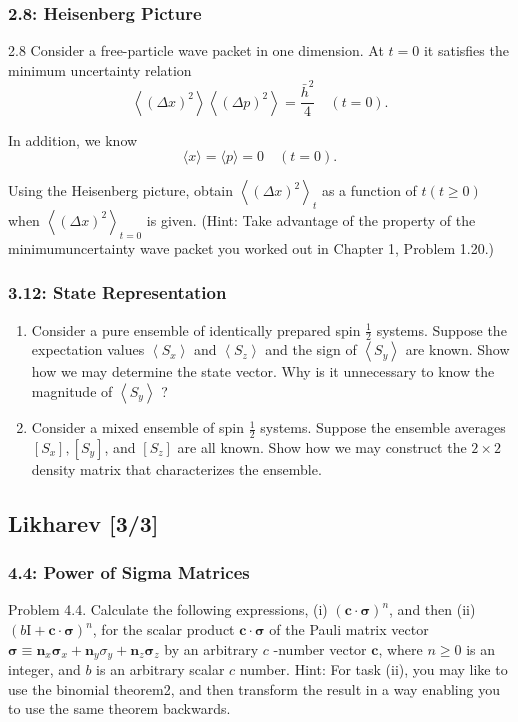 \documentclass[11pt]{article}
\begin{document}
\subsubsection{2.8: Heisenberg Picture}
\label{sec:org493adb9}
2.8 Consider a free-particle wave packet in one dimension. At \(t=0\) it satisfies the minimum uncertainty relation
$$
\left\langle(\Delta x)^2\right\rangle\left\langle(\Delta p)^2\right\rangle=\frac{\bar{h}^2}{4} \quad(t=0) .
$$

In addition, we know
$$
\langle x\rangle=\langle p\rangle=0 \quad(t=0) .
$$

Using the Heisenberg picture, obtain \(\left\langle(\Delta x)^2\right\rangle_t\) as a function of \(t(t \geq 0)\) when \(\left\langle(\Delta x)^2\right\rangle_{t=0}\) is given. (Hint: Take advantage of the property of the minimumuncertainty wave packet you worked out in Chapter 1, Problem 1.20.)
\subsubsection{3.12: State Representation}
\label{sec:org48bc0b4}
\begin{enumerate}
\item Consider a pure ensemble of identically prepared spin \(\frac{1}{2}\) systems.
Suppose the expectation values \(\left\langle S_x\right\rangle\) and
\(\left\langle S_z\right\rangle\) and the sign of \(\left\langle
   S_y\right\rangle\) are known. Show how we may determine the state vector. Why
is it unnecessary to know the magnitude of \(\left\langle S_y\right\rangle\) ?

\item Consider a mixed ensemble of spin \(\frac{1}{2}\) systems. Suppose the ensemble
averages \(\left[S_x\right],\left[S_y\right]\), and \(\left[S_z\right]\) are all
known. Show how we may construct the \(2 \times 2\) density matrix that
characterizes the ensemble.
\end{enumerate}
\subsection{Likharev [3/3]}
\label{sec:org2e076ca}
\subsubsection{4.4: Power of Sigma Matrices}
\label{sec:orgac3360c}
Problem 4.4. Calculate the following expressions, (i) \((\mathbf{c} \cdot
\boldsymbol{\sigma})^n\), and then (ii) \((b \mathrm{I}+\mathbf{c} \cdot
\boldsymbol{\sigma})^n\), for the scalar product \(\mathbf{c} \cdot
\boldsymbol{\sigma}\) of the Pauli matrix vector \(\boldsymbol{\sigma} \equiv
\mathbf{n}_x \boldsymbol{\sigma}_x+\mathbf{n}_y \sigma_y+\mathbf{n}_z
\boldsymbol{\sigma}_z\) by an arbitrary \(c\) -number vector \(\mathbf{c}\), where \(n
\geqslant 0\) is an integer, and \(b\) is an arbitrary scalar \(c\) number. Hint: For
task (ii), you may like to use the binomial theorem2, and then transform the
result in a way enabling you to use the same theorem backwards.
\end{document}
